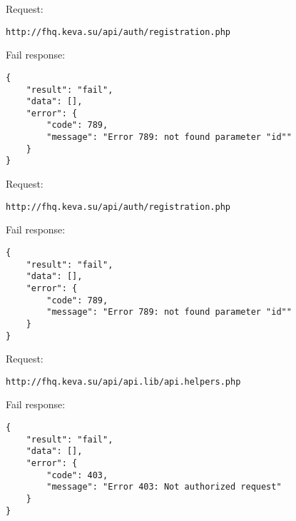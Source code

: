 Request:
\begin{Verbatim}[frame=single]
http://fhq.keva.su/api/auth/registration.php
\end{Verbatim}

Fail response:
\begin{Verbatim}[frame=single]
{
    "result": "fail",
    "data": [],
    "error": {
        "code": 789,
        "message": "Error 789: not found parameter "id""
    }
}
\end{Verbatim}

Request:
\begin{Verbatim}[frame=single]
http://fhq.keva.su/api/auth/registration.php
\end{Verbatim}

Fail response:
\begin{Verbatim}[frame=single]
{
    "result": "fail",
    "data": [],
    "error": {
        "code": 789,
        "message": "Error 789: not found parameter "id""
    }
}
\end{Verbatim}

Request:
\begin{Verbatim}[frame=single]
http://fhq.keva.su/api/api.lib/api.helpers.php
\end{Verbatim}

Fail response:
\begin{Verbatim}[frame=single]
{
    "result": "fail",
    "data": [],
    "error": {
        "code": 403,
        "message": "Error 403: Not authorized request"
    }
}
\end{Verbatim}
